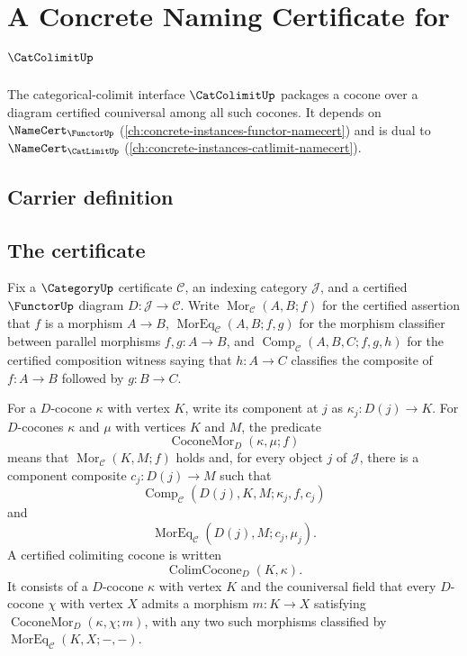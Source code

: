 \chapter{A Concrete Naming Certificate for $\CatColimitUp$}
\label{ch:concrete-instances-catcolimit-namecert}

The categorical-colimit interface $\CatColimitUp$ packages a cocone over a diagram certified couniversal among all such cocones. It depends on $\NameCert_{\FunctorUp}$ (\autoref{ch:concrete-instances-functor-namecert}) and is dual to $\NameCert_{\CatLimitUp}$ (\autoref{ch:concrete-instances-catlimit-namecert}).

\section{Carrier definition}
\label{sec:catcolimit-carrier}

\section{The certificate}
\label{sec:catcolimit-certificate}

\begin{definition}\label{def:catcolimit-fixed-diagram-cocone-comparison-data}
Fix a $\CategoryUp$ certificate $\mathcal C$, an indexing category $\mathcal J$, and a certified $\FunctorUp$ diagram $D:\mathcal J\to\mathcal C$. Write $\operatorname{Mor}_{\mathcal C}(A,B;f)$ for the certified assertion that $f$ is a morphism $A\to B$, $\operatorname{MorEq}_{\mathcal C}(A,B;f,g)$ for the morphism classifier between parallel morphisms $f,g:A\to B$, and $\operatorname{Comp}_{\mathcal C}(A,B,C;f,g,h)$ for the certified composition witness saying that $h:A\to C$ classifies the composite of $f:A\to B$ followed by $g:B\to C$.

For a $D$-cocone $\kappa$ with vertex $K$, write its component at $j$ as $\kappa_j:D(j)\to K$. For $D$-cocones $\kappa$ and $\mu$ with vertices $K$ and $M$, the predicate
$$
\operatorname{CoconeMor}_{D}(\kappa,\mu;f)
$$
means that $\operatorname{Mor}_{\mathcal C}(K,M;f)$ holds and, for every object $j$ of $\mathcal J$, there is a component composite $c_j:D(j)\to M$ such that
$$
\operatorname{Comp}_{\mathcal C}(D(j),K,M;\kappa_j,f,c_j)
$$
and
$$
\operatorname{MorEq}_{\mathcal C}(D(j),M;c_j,\mu_j).
$$
A certified colimiting cocone is written
$$
\operatorname{ColimCocone}_{D}(K,\kappa).
$$
It consists of a $D$-cocone $\kappa$ with vertex $K$ and the couniversal field that every $D$-cocone $\chi$ with vertex $X$ admits a morphism $m:K\to X$ satisfying $\operatorname{CoconeMor}_{D}(\kappa,\chi;m)$, with any two such morphisms classified by $\operatorname{MorEq}_{\mathcal C}(K,X;-,-)$.
\end{definition}


